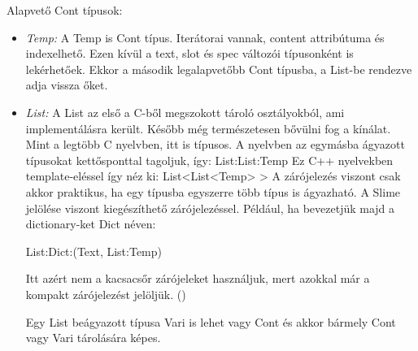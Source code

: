 Alapvető Cont típusok:
\begin{itemize}
\item \emph{Temp:} 
A Temp is Cont típus. 
Iterátorai vannak, content attribútuma és indexelhető.
Ezen kívül a text, slot és spec változói típusonként is lekérhetőek.
Ekkor a második legalapvetőbb Cont típusba, a List-be rendezve adja vissza őket.
\item \emph{List:} 
A List az első a C-ből megszokott tároló osztályokból, ami implementálásra került.
Később még természetesen bővülni fog a kínálat.
Mint a legtöbb C nyelvben, itt is típusos.
A nyelvben az egymásba ágyazott típusokat kettősponttal tagoljuk, így: List:List:Temp
Ez C++ nyelvekben template-eléssel így néz ki: List<List<Temp> >
A zárójelezés viszont csak akkor praktikus, ha egy típusba egyszerre több típus is ágyazható. 
A Slime jelölése viszont kiegészíthető zárójelezéssel. 
Például, ha bevezetjük majd a dictionary-ket Dict néven:

List:Dict:(Text, List:Temp)

Itt azért nem a kacsacsőr zárójeleket használjuk, mert azokkal már a kompakt zárójelezést jelöljük. ()

Egy List beágyazott típusa Vari is lehet vagy Cont és akkor bármely Cont vagy Vari tárolására képes.


\end{itemize}
